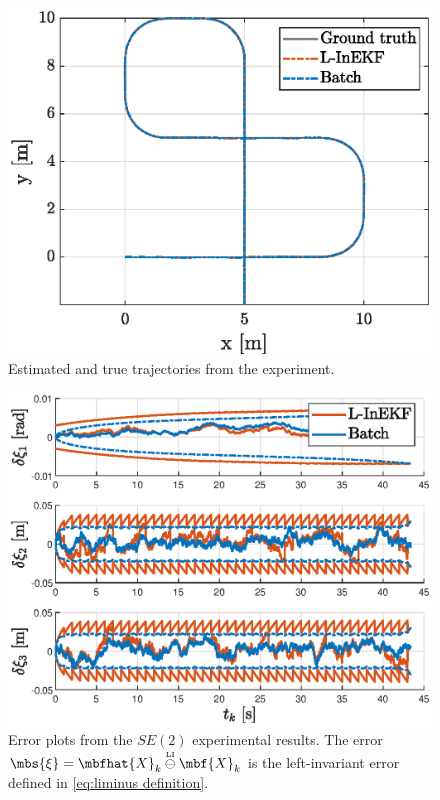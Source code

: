 \documentclass[ nobib, nofonts, notoc]{tufte-handout}
\newcommand{\liminus}{\overset{{\scriptscriptstyle\mathrm{LI}}}{\ominus}}
\begin{document}
    \begin{figure}[ht]
      \centering
      \includegraphics[width=\textwidth]{figs/se2_example_trajectories.eps}
      \caption{Estimated and true trajectories from the experiment.}
      \label{fig:se2_example_trajectories.eps}
    \end{figure}
    
    \begin{figure}[ht]
      \centering
      \includegraphics[width=\textwidth]{figs/se2_example_error_plots.eps}
      \caption{
          Error plots from the $SE(2)$ experimental results.
          The error $\mbs{\xi} = \mbfhat{X}_{k}\liminus \mbf{X}_{k}$ is the left-invariant error defined in \eqref{eq:liminus definition}.
        }
      \label{fig:se2_example_error_plots.eps}
    \end{figure}
    
    \clearpage
    \printbibliography
\end{document}
